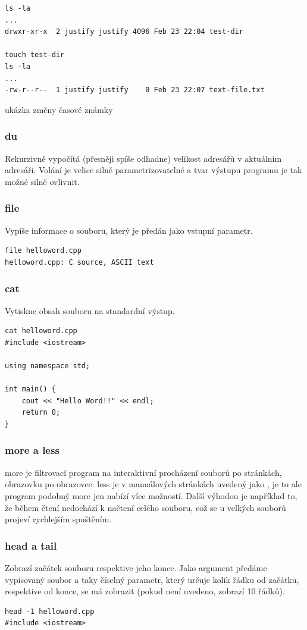 \documentclass{article}
\begin{document}
\begin{verbatim}
ls -la
...
drwxr-xr-x  2 justify justify 4096 Feb 23 22:04 test-dir

touch test-dir
ls -la
...
-rw-r--r--  1 justify justify    0 Feb 23 22:07 text-file.txt
\end{verbatim}
ukázka změny časové známky

\subsubsection{du}
Rekurzivně vypočítá (přesněji spíše odhadne) velikost adresářů v aktuálním adresáři. Volání je velice silně parametrizovatelné a tvar výstupu programu je tak možné silně ovlivnit.

\subsubsection{file}
Vypíše informace o souboru, který je předán jako vstupní parametr.
\begin{verbatim}
file helloword.cpp
helloword.cpp: C source, ASCII text
\end{verbatim}

\subsubsection{cat}
Vytiskne obsah souboru na standardní výstup.
\begin{verbatim}
cat helloword.cpp
#include <iostream>

using namespace std;

int main() {
	cout << "Hello Word!!" << endl;	
	return 0;	
}
\end{verbatim}

\subsubsection{more a less}
more je filtrovací program na interaktivní procházení souborů po stránkách, obrazovku po obrazovce. less je v manuálových stránkách uvedený jako , je to ale program podobný more jen nabízí více možností. Další výhodou je například to, že během čtení nedochází k načtení celého souboru, což se u velkých souborů projeví rychlejším spuštěním.

\subsubsection{head a tail}
Zobrazí začátek souboru respektive jeho konec. Jako argument předáme vypisovaný soubor a taky číselný parametr, který určuje kolik řádku od začátku, respektive od konce, se má zobrazit (pokud není uvedeno, zobrazí 10 řádků).
\begin{verbatim}
head -1 helloword.cpp
#include <iostream>
\end{verbatim}
\end{document}

